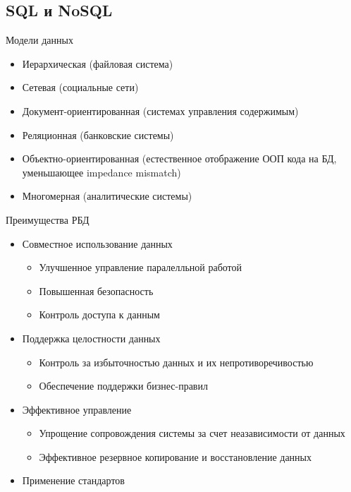 \documentclass[12pt]{article}
\begin{document}
\newpage

\subsection{SQL и NoSQL}

\begin{nota}{Модели данных}
    \begin{itemize}
        \item Иерархическая (файловая система)
        \item Сетевая (социальные сети)
        \item Документ-ориентированная (системах управления содержимым)
        \item Реляционная (банковские системы)
        \item Объектно-ориентированная (естественное отображение ООП кода на БД, уменьшающее impedance mismatch)
        \item Многомерная (аналитические системы)
    \end{itemize}
\end{nota}

\begin{nota}{Преимущества РБД}
    \begin{itemize}
        \item Совместное использование данных
        
        \begin{itemize}
            \item Улучшенное управление паралелльной работой
            \item Повышенная безопасность 
            \item Контроль доступа к данным 
        \end{itemize}

        \item Поддержка целостности данных 
        
        \begin{itemize}
            \item Контроль за избыточностью данных и их непротиворечивостью
            \item Обеспечение поддержки бизнес-правил 
        \end{itemize}

        \item Эффективное управление 
        
        \begin{itemize}
            \item Упрощение сопровождения системы за счет неазависимости от данных 
            \item Эффективное резервное копирование и восстановление данных
        \end{itemize}

        \item Применение стандартов 
    \end{itemize}
\end{nota}
\end{document}
